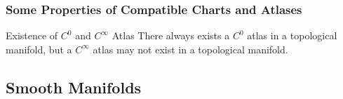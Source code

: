 \subsubsection{Some Properties of Compatible Charts and Atlases}
\begin{Theorem}{Existence of $C^0$ and $C^{\infty}$ Atlas}\label{existence_of_continuous_and_smooth_atlas}
	There always exists a $C^0$ atlas in a topological manifold, but a $C^{\infty}$ atlas may not exist in a topological manifold.
\end{Theorem}
\subsection{Smooth Manifolds}